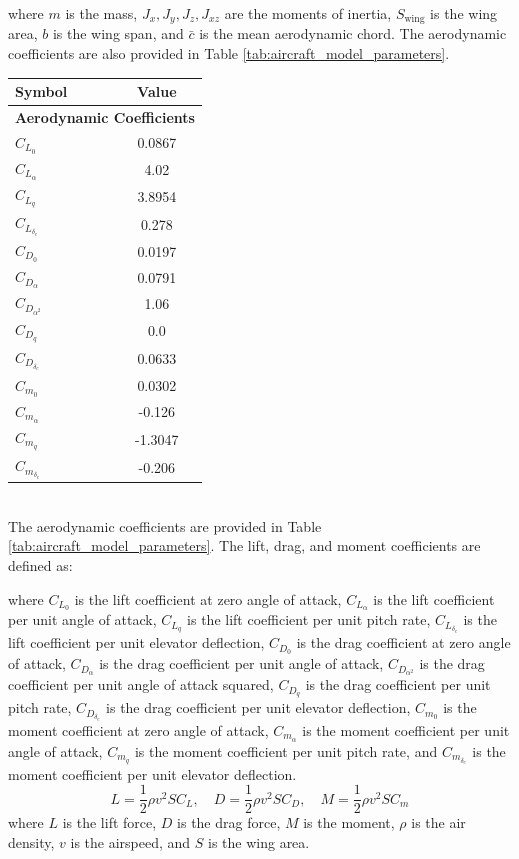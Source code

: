 \documentclass[journal,article,submit,pdftex,moreauthors]{Definitions/mdpi}
\begin{document}
where \(m\) is the mass, \(J_x, J_y, J_z, J_{xz}\) are the moments of inertia, \(S_{\text{wing}}\) is the wing area, \(b\) is the wing span, and \(\bar{c}\) is the mean aerodynamic chord. The aerodynamic coefficients are also provided in Table \ref{tab:aircraft_model_parameters}.

\begin{tabular}{|l|c|}
    \hline
    \textbf{Symbol} & \textbf{Value} \\ \hline
    \multicolumn{2}{|c|}{\textbf{Aerodynamic Coefficients}} \\ \hline
    \( C_{L_0} \) & 0.0867 \\ \hline
    \( C_{L_\alpha} \) & 4.02 \\ \hline
    \( C_{L_q} \) & 3.8954 \\ \hline
    \( C_{L_{\delta_e}} \) & 0.278 \\ \hline
    \( C_{D_0} \) & 0.0197 \\ \hline
    \( C_{D_\alpha} \) & 0.0791 \\ \hline
    \( C_{D_{\alpha^2}} \) & 1.06 \\ \hline
    \( C_{D_q} \) & 0.0 \\ \hline
    \( C_{D_{\delta_e}} \) & 0.0633 \\ \hline
    \( C_{m_0} \) & 0.0302 \\ \hline
    \( C_{m_\alpha} \) & -0.126 \\ \hline
    \( C_{m_q} \) & -1.3047 \\ \hline
    \( C_{m_{\delta_e}} \) & -0.206 \\ \hline
\end{tabular} \\
The aerodynamic coefficients are provided in Table \ref{tab:aircraft_model_parameters}. The lift, drag, and moment coefficients are defined as:

where \(C_{L_0}\) is the lift coefficient at zero angle of attack, \(C_{L_\alpha}\) is the lift coefficient per unit angle of attack, \(C_{L_q}\) is the lift coefficient per unit pitch rate, \(C_{L_{\delta_e}}\) is the lift coefficient per unit elevator deflection, \(C_{D_0}\) is the drag coefficient at zero angle of attack, \(C_{D_\alpha}\) is the drag coefficient per unit angle of attack, \(C_{D_{\alpha^2}}\) is the drag coefficient per unit angle of attack squared, \(C_{D_q}\) is the drag coefficient per unit pitch rate, \(C_{D_{\delta_e}}\) is the drag coefficient per unit elevator deflection, \(C_{m_0}\) is the moment coefficient at zero angle of attack, \(C_{m_\alpha}\) is the moment coefficient per unit angle of attack, \(C_{m_q}\) is the moment coefficient per unit pitch rate, and \(C_{m_{\delta_e}}\) is the moment coefficient per unit elevator deflection.
\begin{equation}
    L = \frac{1}{2} \rho v^2 S C_L, \quad D = \frac{1}{2} \rho v^2 S C_D, \quad M = \frac{1}{2} \rho v^2 S C_m
\end{equation}
where \(L\) is the lift force, \(D\) is the drag force, \(M\) is the moment, \(\rho\) is the air density, \(v\) is the airspeed, and \(S\) is the wing area.
\end{document}
